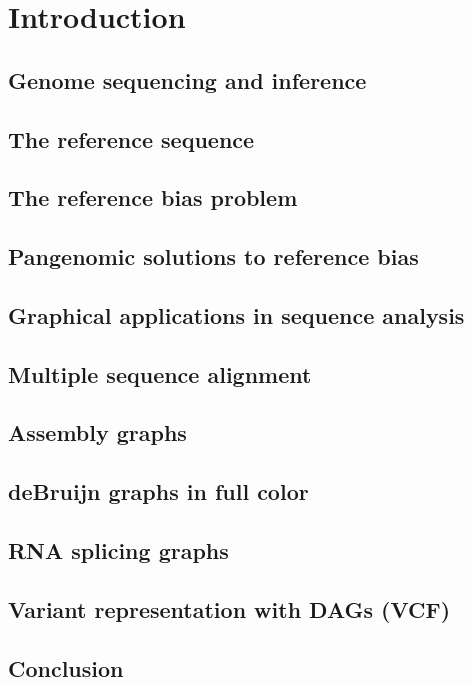 
\chapter{Introduction}  %

\ifpdf
    \graphicspath{{Chapter1/Figs/Raster/}{Chapter1/Figs/PDF/}{Chapter1/Figs/}}
\else
    \graphicspath{{Chapter1/Figs/Vector/}{Chapter1/Figs/}}
\fi


\section{Genome sequencing and inference}

\section{The reference sequence}

\section{The reference bias problem}

\section{Pangenomic solutions to reference bias}  %

\section{Graphical applications in sequence analysis}

\section{Multiple sequence alignment}

\section{Assembly graphs}

\section{deBruijn graphs in full color}

\section{RNA splicing graphs}

\section{Variant representation with DAGs (VCF)}

\section{Conclusion}


